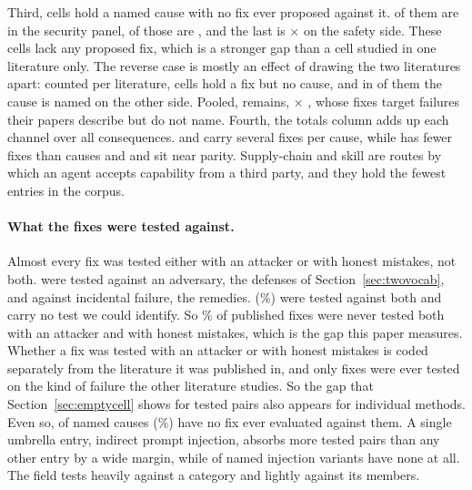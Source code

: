 Third, \NCellsAttackNoDef{} cells hold a named cause with no fix ever proposed
against it. \NCellsAttackNoDefSec{} of them are in the security panel,
\NCellsAttackNoDefBackdoor{} of those are , and the
last is  $\times$  on the safety side.
These cells lack any proposed fix, which is a stronger gap than a cell
studied in one literature only. The reverse case is mostly an effect of
drawing the two literatures apart: counted per literature, \NCellFixOnly{}
cells hold a fix but no cause, and in \NCellFixOnlyOther{} of them the cause
is named on the other side. Pooled, \NCellFixOnlyPooled{} remains,
 $\times$ , whose
\NCellFixOnlyPooledFixes{} fixes target failures their papers describe but
do not name. Fourth, the totals column adds up each channel over all consequences.
 and  carry several fixes per cause, while
 has fewer fixes than causes and  and
 sit near parity. Supply-chain and skill are routes by which an
agent accepts capability from a third party, and they hold the fewest entries
in the corpus.


\paragraph{What the fixes were tested against.} Almost every fix was tested
either with an attacker or with honest mistakes, not both. \NDefenseFix{} were tested against an adversary, the
defenses of Section~\ref{sec:twovocab}, and \NRemedy{} against incidental
failure, the remedies. \NBothValidated{} (\PctBothValidated{}\%) were tested
against both and \NNoValidation{} carry no test we could identify. So
\PctOneRegime{}\% of published fixes were never tested both with an attacker and with honest mistakes,
which is the gap this paper measures. Whether a fix was
tested with an attacker or with honest mistakes is coded separately from the literature it was published in, and
only \NDefCrossRegime{} fixes were ever tested on the kind of failure the other
literature studies. So the gap that Section~\ref{sec:emptycell} shows for tested pairs also
appears for individual methods. Even so, \NMechUncovered{} of \NMechanismsBench{} named causes
(\PctMechUncovered{}\%) have no fix ever evaluated against them. A single
umbrella entry, indirect prompt injection, absorbs more tested pairs than any
other entry by a wide margin, while \NInjUncovered{} of \NInjVariants{} named
injection variants have none at all. The field tests heavily against a
category and lightly against its members.

